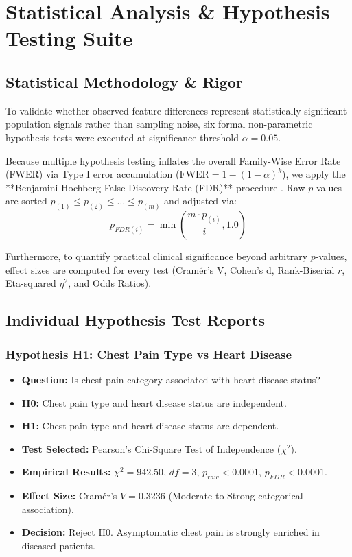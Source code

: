 \chapter{Statistical Analysis \& Hypothesis Testing Suite}

\section{Statistical Methodology \& Rigor}
To validate whether observed feature differences represent statistically significant population signals rather than sampling noise, six formal non-parametric hypothesis tests were executed at significance threshold $\alpha = 0.05$. 

Because multiple hypothesis testing inflates the overall Family-Wise Error Rate (FWER) via Type I error accumulation ($\text{FWER} = 1 - (1 - \alpha)^k$), we apply the **Benjamini-Hochberg False Discovery Rate (FDR)** procedure \cite{benjamini1995controlling}. Raw $p$-values are sorted $p_{(1)} \le p_{(2)} \le \dots \le p_{(m)}$ and adjusted via:
\begin{equation}
p_{FDR(i)} = \min\left( \frac{m \cdot p_{(i)}}{i}, 1.0 \right)
\end{equation}

Furthermore, to quantify practical clinical significance beyond arbitrary $p$-values, effect sizes are computed for every test (Cramér's V, Cohen's d, Rank-Biserial $r$, Eta-squared $\eta^2$, and Odds Ratios).

\section{Individual Hypothesis Test Reports}

\subsection{Hypothesis H1: Chest Pain Type vs Heart Disease}
\begin{itemize}
    \item \textbf{Question:} Is chest pain category associated with heart disease status?
    \item \textbf{H0:} Chest pain type and heart disease status are independent.
    \item \textbf{H1:} Chest pain type and heart disease status are dependent.
    \item \textbf{Test Selected:} Pearson's Chi-Square Test of Independence ($\chi^2$).
    \item \textbf{Empirical Results:} $\chi^2 = 942.50$, $df = 3$, $p_{raw} < 0.0001$, $p_{FDR} < 0.0001$.
    \item \textbf{Effect Size:} Cramér's $V = 0.3236$ (Moderate-to-Strong categorical association).
    \item \textbf{Decision:} Reject H0. Asymptomatic chest pain is strongly enriched in diseased patients.
\end{itemize}

